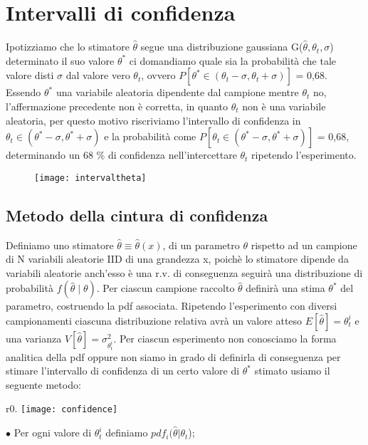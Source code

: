 \documentclass[11pt,a4paper]{book}
\begin{document}
\section{Intervalli di confidenza}

Ipotizziamo che lo stimatore $\hat{\theta}$ segue una distribuzione gaussiana G($\hat{\theta},\theta_t,\sigma$) determinato il suo valore $\theta^*$ ci domandiamo quale sia la probabilit\`{a} che tale valore disti $\sigma$ dal valore vero $\theta_t$, ovvero $P[\theta^* \in (\theta_t - \sigma, \theta_t + \sigma)]$ = 0,68. Essendo $\theta^*$ una variabile aleatoria dipendente dal campione mentre $\theta_t$ no, l'affermazione precedente non \`{e} corretta, in quanto $\theta_t$ non \`{e} una variabile aleatoria, per questo motivo riscriviamo l'intervallo di confidenza in $ \theta_t \in (\theta^* - \sigma,\theta^* + \sigma)$ e la probabilit\`{a} come $P[\theta_t \in (\theta^* - \sigma, \theta^* + \sigma)]$ = 0,68, determinando un 68 \% di confidenza nell'intercettare $\theta_t$ ripetendo l'esperimento.
\begin{figure}[ht]
\vspace{0.1in}
\texttt{[image: intervaltheta]}	
\centering
\end{figure}

\subsection{Metodo della cintura di confidenza}

Definiamo uno stimatore $\hat{\theta} \equiv \hat{\theta}(x)$, di un parametro $\theta$ rispetto ad un campione di N variabili aleatorie IID di una grandezza x, poich\`{e} lo stimatore dipende da variabili aleatorie anch'esso \`{e} una r.v. di conseguenza seguir\`{a} una distribuzione di probabilit\`{a} $f(\hat{\theta} \;\vert \; \theta)$. Per ciascun campione raccolto $\hat{\theta}$ definir\`{a} una stima $\theta^*$ del parametro, costruendo la pdf associata. Ripetendo l'esperimento con diversi campionamenti ciascuna distribuzione relativa  avr\`{a} un valore atteso $E[\hat{\theta}] = \theta_{t}^{i}$ e una varianza $V[\hat{\theta}] = \sigma_{\theta_{t}^i}^2$.\newline
Per ciascun esperimento non conosciamo la forma analitica della pdf oppure non siamo in grado di definirla di conseguenza per stimare l'intervallo di confidenza di un certo valore di $\theta^*$ stimato usiamo il seguente metodo:
\newline
\begin{wrapfigure}{r}{0.\textwidth}
\centering
\texttt{[image: confidence]}	
\end{wrapfigure}
$\bullet$ Per ogni valore di $\theta_{t}^i$ definiamo $pdf_i(\hat{\theta} \vert \theta_t$);\newline
\end{document}
